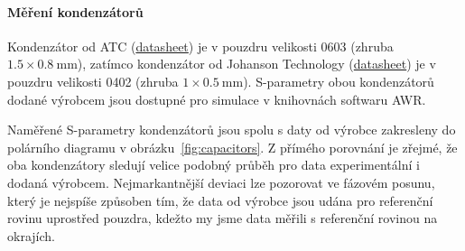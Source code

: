 \documentclass[11pt,a4paper]{article}
\begin{document}
\paragraph*{Měření kondenzátorů} Kondenzátor od ATC (\href{https://rfs.kyocera-avx.com/millimeter-wave-surface-mount-capacitors}{datasheet}) je v pouzdru velikosti 0603 (zhruba $1.5 \times 0.8\ \mathrm{mm}$), zatímco kondenzátor od Johanson Technology (\href{https://www.johansontechnology.com/r07s}{datasheet}) je v pouzdru velikosti 0402 (zhruba $1 \times 0.5\ \mathrm{mm}$). S-parametry obou kondenzátorů dodané výrobcem jsou dostupné pro simulace v knihovnách softwaru AWR.

Naměřené S-parametry kondenzátorů jsou spolu s daty od výrobce zakresleny do polárního diagramu v obrázku~\ref{fig:capacitors}. Z přímého porovnání je zřejmé, že oba kondenzátory sledují velice podobný průběh pro data experimentální i dodaná výrobcem. Nejmarkantnější deviaci lze pozorovat ve fázovém posunu, který je nejspíše způsoben tím, že data od výrobce jsou udána pro referenční rovinu uprostřed pouzdra, kdežto my jsme data měřili s referenční rovinou na okrajích.
\end{document}
